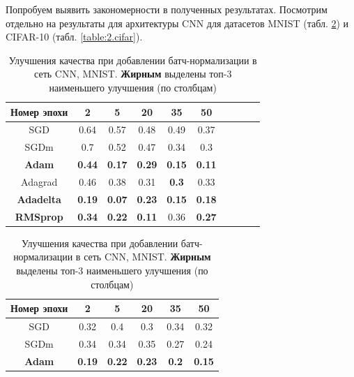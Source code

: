 \documentclass[12pt]{article}
\begin{document}
Попробуем выявить закономерности в полученных результатах. Посмотрим отдельно на результаты для архитектуры CNN для датасетов MNIST (табл. \ref{table:2.mnist}) и CIFAR-10 (табл. \ref{table:2.cifar}).


\begin{table}[h!]
\centering
\small
\begin{minipage}{0.45\linewidth}
\centering
\begin{tabular}{|c|c|c|c|c|c|c|c|c|c|}\hline
\textbf{Номер эпохи} & \textbf{2} & \textbf{5}  & \textbf{20}  & \textbf{35} & \textbf{50} \\\hline

SGD & 0.64 & 0.57  & 0.48  & 0.49 & 0.37 \\\hline

SGDm & 0.7 & 0.52  & 0.47  & 0.34 & 0.3 \\\hline

\textbf{Adam} & \textbf{0.44} & \textbf{0.17}  & \textbf{0.29}  & \textbf{0.15} & \textbf{0.11} \\\hline

Adagrad & 0.46 & 0.38  & 0.31 & \textbf{0.3} & 0.33 \\\hline

\textbf{Adadelta} & \textbf{0.19} & \textbf{0.07}  & \textbf{0.23} & \textbf{0.15} & \textbf{0.18} \\\hline

\textbf{RMSprop} & \textbf{0.34} & \textbf{0.22}  & \textbf{0.11}  & 0.36 & \textbf{0.27} \\\hline
\end{tabular}
\caption{\small Улучшения качества при добавлении батч-нормализации в сеть CNN, MNIST. \textbf{Жирным} выделены топ-3 наименьшего улучшения (по столбцам)} \label{table:2.mnist}
\end{minipage} \hfill
\begin{minipage}{0.45\linewidth}
\centering
\begin{tabular}{|c|c|c|c|c|c|}\hline
\textbf{Номер эпохи} & \textbf{2} & \textbf{5} & \textbf{20} & \textbf{35} & \textbf{50} \\\hline
SGD & 0.32 & 0.4 & 0.3 & 0.34 & 0.32 \\\hline

SGDm & 0.34 & 0.34 & 0.35 & 0.27 & 0.24 \\\hline

\textbf{Adam} & \textbf{0.19} & \textbf{0.22} & \textbf{0.23} &\textbf{ 0.2} & \textbf{0.15} \\\hline


\end{tabular}
\end{minipage}
\end{table}
\end{document}
